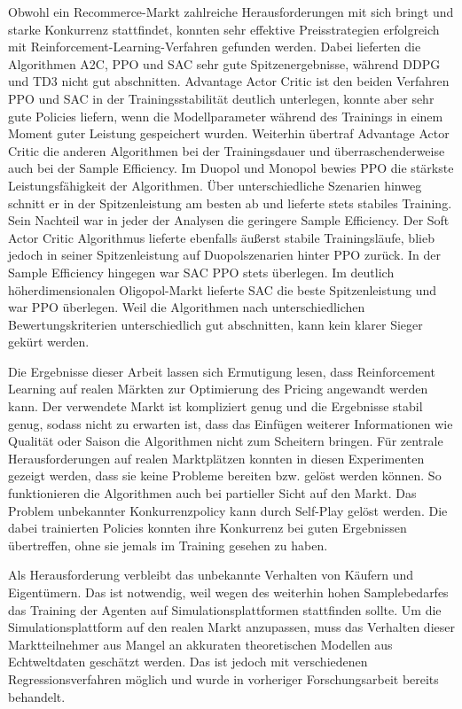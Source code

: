 Obwohl ein Recommerce-Markt zahlreiche Herausforderungen mit sich bringt und starke Konkurrenz stattfindet, konnten sehr effektive Preisstrategien erfolgreich mit Reinforcement-Learning-Verfahren gefunden werden.
Dabei lieferten die Algorithmen A2C, PPO und SAC sehr gute Spitzenergebnisse, während DDPG und TD3 nicht gut abschnitten.
Advantage Actor Critic ist den beiden Verfahren PPO und SAC in der Trainingsstabilität deutlich unterlegen, konnte aber sehr gute Policies liefern, wenn die Modellparameter während des Trainings in einem Moment guter Leistung gespeichert wurden.
Weiterhin übertraf Advantage Actor Critic die anderen Algorithmen bei der Trainingsdauer und überraschenderweise auch bei der Sample Efficiency.
Im Duopol und Monopol bewies PPO die stärkste Leistungsfähigkeit der Algorithmen.
Über unterschiedliche Szenarien hinweg schnitt er in der Spitzenleistung am besten ab und lieferte stets stabiles Training.
Sein Nachteil war in jeder der Analysen die geringere Sample Efficiency.
Der Soft Actor Critic Algorithmus lieferte ebenfalls äußerst stabile Trainingsläufe, blieb jedoch in seiner Spitzenleistung auf Duopolszenarien hinter PPO zurück.
In der Sample Efficiency hingegen war SAC PPO stets überlegen.
Im deutlich höherdimensionalen Oligopol-Markt lieferte SAC die beste Spitzenleistung und war PPO überlegen.
Weil die Algorithmen nach unterschiedlichen Bewertungskriterien unterschiedlich gut abschnitten, kann kein klarer Sieger gekürt werden.

Die Ergebnisse dieser Arbeit lassen sich Ermutigung lesen, dass Reinforcement Learning auf realen Märkten zur Optimierung des Pricing angewandt werden kann.
Der verwendete Markt ist kompliziert genug und die Ergebnisse stabil genug, sodass nicht zu erwarten ist, dass das Einfügen weiterer Informationen wie Qualität oder Saison die Algorithmen nicht zum Scheitern bringen.
Für zentrale Herausforderungen auf realen Marktplätzen konnten in diesen Experimenten gezeigt werden, dass sie keine Probleme bereiten bzw. gelöst werden können.
So funktionieren die Algorithmen auch bei partieller Sicht auf den Markt.
Das Problem unbekannter Konkurrenzpolicy kann durch Self-Play gelöst werden.
Die dabei trainierten Policies konnten ihre Konkurrenz bei guten Ergebnissen übertreffen, ohne sie jemals im Training gesehen zu haben.

Als Herausforderung verbleibt das unbekannte Verhalten von Käufern und Eigentümern.
Das ist notwendig, weil wegen des weiterhin hohen Samplebedarfes das Training der Agenten auf Simulationsplattformen stattfinden sollte.
Um die Simulationsplattform auf den realen Markt anzupassen, muss das Verhalten dieser Marktteilnehmer aus Mangel an akkuraten theoretischen Modellen aus Echtweltdaten geschätzt werden.
Das ist jedoch mit verschiedenen Regressionsverfahren möglich und wurde in vorheriger Forschungsarbeit bereits behandelt.


